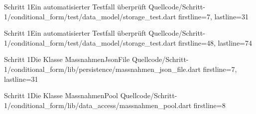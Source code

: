 \begin{alexlistingzwei}{Schritt 1}{Ein automatisierter Testfall überprüft}
  {Quellcode/Schritt-1/conditional_form/test/data_model/storage_test.dart}
  {firstline=7, lastline=31}
  \label{lst:Schritt1MaßnahmenSerialisierenOhneFehlerUnitTest}
\end{alexlistingzwei}



\begin{alexlistingzwei}{Schritt 1}{Ein automatisierter Testfall überprüft}
  {Quellcode/Schritt-1/conditional_form/test/data_model/storage_test.dart}
  {firstline=48, lastline=74}
  \label{lst:Schritt1MaßnahmenDeserialisierenOhneFehlerUnitTest}
\end{alexlistingzwei}





\begin{alexlistingzwei}{Schritt 1}{Die Klasse MassnahmenJsonFile}
  {Quellcode/Schritt-1/conditional_form/lib/persistence/massnahmen_json_file.dart}
  {firstline=7, lastline=31}
  \label{lst:Schritt1KlasseMassnahmenJsonFile}
\end{alexlistingzwei}

\begin{alexlistingzwei}{Schritt 1}{Die Klasse MassnahmenPool}
  {Quellcode/Schritt-1/conditional_form/lib/data_access/massnahmen_pool.dart}
  {firstline=8}
  \label{lst:Schritt1KlasseMassnahmenPool}
\end{alexlistingzwei}















